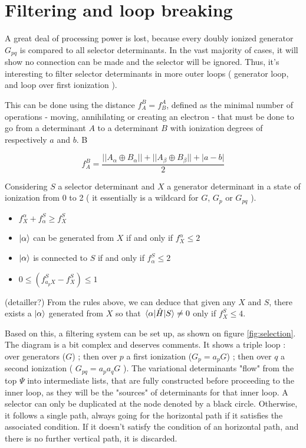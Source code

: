 \documentclass[./thesis.tex]{subfiles}
\begin{document}
\section{Filtering and loop breaking}
A great deal of processing power is lost, because every doubly ionized generator $G_{pq}$ is compared to all selector determinants. In the vast majority of cases, it will show no connection can be made and the selector will be ignored. Thus, it's interesting to filter selector determinants in more outer loops ( generator loop, and loop over first ionization ).

This can be done using the distance $f_A^B = f_B^A$, defined as the minimal number of operations - moving, annihilating or creating an electron - that must be done to go from a determinant $A$ to a determinant $B$ with ionization degrees of respectively $a$ and $b$. B



\begin{equation}
f_A^B = \frac{||A_\alpha \oplus B_\alpha|| + ||A_\beta \oplus B_\beta|| + |a-b|}{2}
\end{equation}


Considering $S$ a selector determinant and $X$ a generator determinant in a state of ionization from 0 to 2 ( it essentially is a wildcard for $G$, $G_p$ or $G_{pq}$ ).

\begin{itemize}
\item
$f_X^\alpha + f_\alpha^S \geq f_X^S$
\item
$\ket \alpha$ can be generated from $X$ if and only if $f_X^\alpha \leq 2$
\item
$\ket \alpha$ is connected to $S$ if and only if $f_\alpha^S \leq 2$
\item
$0 \leq (f_{a_p X}^S - f_X^S) \leq 1$
\end{itemize}

(detailler?)
From the rules above, we can deduce that given any $X$ and $S$, there exists a $\ket \alpha$ generated from $X$ so that $\mel{\alpha}{\hat{H}}{S} \neq 0$ only if $f_X^S \leq 4$.

Based on this, a filtering system can be set up, as shown on figure \ref{fig:selection}.\\

The diagram is a bit complex and deserves comments. 
It shows a triple loop : over generators ($G$) ; then over $p$ a first ionization ($G_p = a_p G$) ; then over $q$ a second ionization ( $G_{pq} = a_p a_q G$ ). The variational determinants "flow" from the top $\Psi$ into intermediate lists, that are fully constructed before proceeding to the inner loop, as they will be the "sources" of determinants for that inner loop.
A selector can only be duplicated at the node denoted by a black circle. Otherwise, it follows a single path, always going for the horizontal path if it satisfies the associated condition.
If it doesn't satisfy the condition of an horizontal path, and there is no further vertical path, it is discarded.
\end{document}

